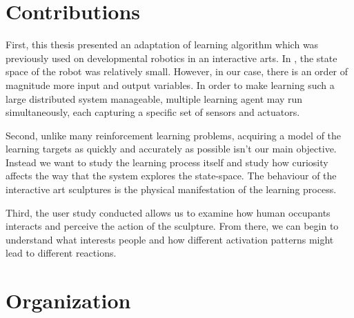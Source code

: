 \section{Contributions}

First, this thesis presented an adaptation of learning algorithm which was previously used on developmental robotics in an interactive arts. In \cite{Oudeyer2007}, the state space of the robot was relatively small. However, in our case, there is an order of magnitude more input and output variables. In order to make learning such a large distributed system manageable, multiple learning agent may run simultaneously, each capturing a specific set of sensors and actuators. 

Second, unlike many reinforcement learning problems, acquiring a model of the learning targets as quickly and accurately as possible isn't our main objective. Instead we want to study the learning process itself and study how curiosity affects the way that the system explores the state-space. The behaviour of the interactive art sculptures is the physical manifestation of the learning process. 

Third, the user study conducted allows us to examine how human occupants interacts and perceive the action of the sculpture. From there, we can begin to understand what interests people and how different activation patterns might lead to different reactions. 


\section{Organization}



